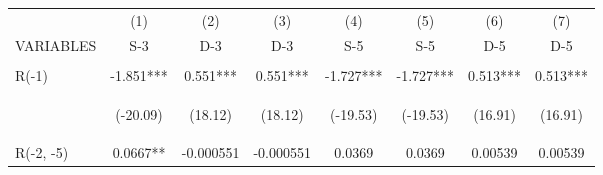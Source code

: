 \documentclass[]{article}
\begin{document}
\begin{center}
\begin{tabular}{lccccccc} \hline
 & (1) & (2) & (3) & (4) & (5) & (6) & (7) \\
VARIABLES & S-3 & D-3 & D-3 & S-5 & S-5 & D-5 & D-5 \\ \hline
\vspace{4pt} & \begin{footnotesize}\end{footnotesize} & \begin{footnotesize}\end{footnotesize} & \begin{footnotesize}\end{footnotesize} & \begin{footnotesize}\end{footnotesize} & \begin{footnotesize}\end{footnotesize} & \begin{footnotesize}\end{footnotesize} & \begin{footnotesize}\end{footnotesize} \\
R(-1) & -1.851*** & 0.551*** & 0.551*** & -1.727*** & -1.727*** & 0.513*** & 0.513*** \\
\vspace{4pt} & \begin{footnotesize}(-20.09)\end{footnotesize} & \begin{footnotesize}(18.12)\end{footnotesize} & \begin{footnotesize}(18.12)\end{footnotesize} & \begin{footnotesize}(-19.53)\end{footnotesize} & \begin{footnotesize}(-19.53)\end{footnotesize} & \begin{footnotesize}(16.91)\end{footnotesize} & \begin{footnotesize}(16.91)\end{footnotesize} \\
R(-2, -5) & 0.0667** & -0.000551 & -0.000551 & 0.0369 & 0.0369 & 0.00539 & 0.00539 \\

\end{tabular}
\end{center}
\end{document}
